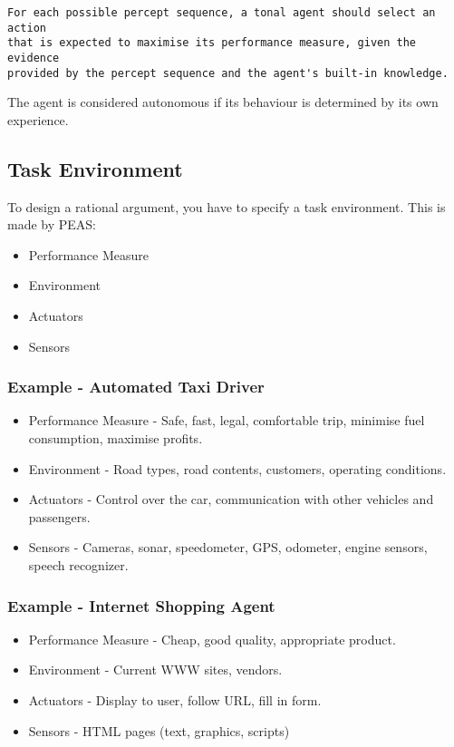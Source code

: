 \documentclass[11pt, oneside]{article}   	%
\begin{document}
\begin{verbatim}
For each possible percept sequence, a tonal agent should select an action
that is expected to maximise its performance measure, given the evidence
provided by the percept sequence and the agent's built-in knowledge.
\end{verbatim}
The agent is considered autonomous if its behaviour is determined by its own experience. 

\subsection{Task Environment}

To design a rational argument, you have to specify a task environment. This is made by PEAS:
\begin{itemize}
\item Performance Measure
\item Environment
\item Actuators
\item Sensors
\end{itemize}

\subsubsection{Example - Automated Taxi Driver}
\begin{itemize}
\item Performance Measure - Safe, fast, legal, comfortable trip, minimise fuel consumption, maximise profits.
\item Environment - Road types, road contents, customers, operating conditions.
\item Actuators - Control over the car, communication with other vehicles and passengers.
\item Sensors - Cameras, sonar, speedometer, GPS, odometer, engine sensors, speech recognizer.
\end{itemize}

\subsubsection{Example - Internet Shopping Agent}
\begin{itemize}
\item Performance Measure - Cheap, good quality, appropriate product.
\item Environment - Current WWW sites, vendors.
\item Actuators - Display to user, follow URL, fill in form.
\item Sensors - HTML pages (text, graphics, scripts)
\end{itemize}
\end{document}
